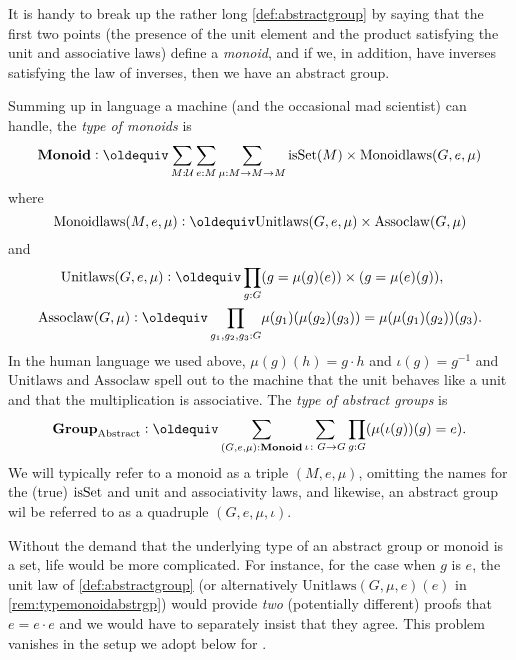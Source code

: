   \begin{remark}
    It is handy to break up the rather long \cref{def:abstractgroup}  by saying that the first two points (\ie the presence of the unit element and the product satisfying the unit and associative laws) define a \emph{monoid}, and if we, in addition, have inverses satisfying the law of inverses, then we have an abstract group.
    \end{remark}


    \begin{remark}\label{rem:typemonoidabstrgp}
        Summing up in language a machine (and the occasional mad scientist) can handle, the \emph{type of monoids} is
$$\typemonoid\defequi \sum_{M:\mathcal U}\sum_{e:M}\sum_{\mu{}:M\to M\to M}
\isset{(M)}\times\mathrm{Monoidlaws}(G,e,\mu)
$$
where
$$\mathrm{Monoidlaws}(M,e,\mu)\defequi\mathrm{Unitlaws}(G,e,\mu)\times\mathrm{Assoclaw}(G,\mu{})$$and
\begin{align*}
  \mathrm{Unitlaws}(G,e,\mu)\defequi\prod_{g:G}
&(g=\mu{}(g)(e))\times(g=\mu{}(e)(g)),\\
\mathrm{Assoclaw}(G,\mu{})\defequi\prod_{g_1,g_2,g_3:G}&\mu{}(g_1)(\mu{}(g_2)(g_3))=\mu{}(\mu{}(g_1)(g_2))(g_3).
\end{align*}
In the human language we used above, $\mu(g)(h)=g\cdot h$ and $\iota(g)=g^{-1}$ and $\mathrm{Unitlaws}$ and $\mathrm{Assoclaw}$ spell out to the machine that the unit behaves like a unit and that the multiplication is associative.
The
\emph{type of abstract groups} is
$$\typeabsgp\defequi
\sum_{(G,e,\mu):\typemonoid}\sum_{\iota\colon G\to G}\prod_{g:G}(\mu{}(\iota{}(g))(g)=e).$$
We will typically refer to a monoid as a triple $(M,e,\mu)$, omitting the names for the (true) $\mathrm{isSet}$ and unit and associativity laws, and likewise, an abstract group wil be referred to as a quadruple $(G,e,\mu,\iota)$.
\end{remark}
  \begin{remark}
Without the demand that the underlying type of an abstract group or monoid is a set, life would be more complicated.  For instance, for the case when $g$ is $e$, the unit law of \cref{def:abstractgroup} (or alternatively $\mathrm{Unitlaws}(G,\mu{},e)(e)$ in \cref{rem:typemonoidabstrgp}) would provide \emph{two} (potentially different) proofs that $e=e\cdot e$ and we would have to separately insist that they agree.  This problem vanishes in the setup we adopt below for \inftygps.
  \end{remark}

